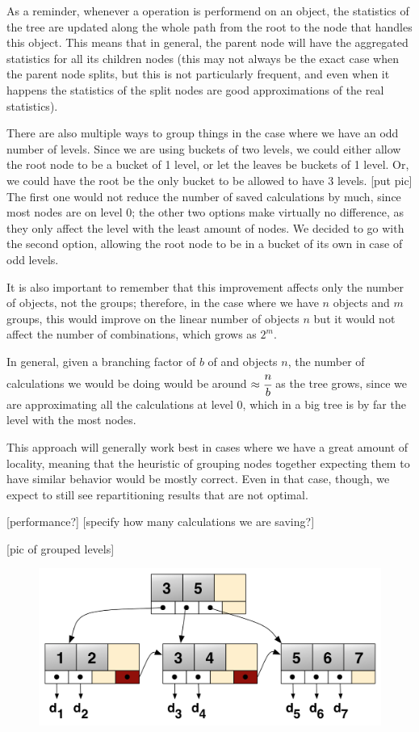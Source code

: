 As a reminder, whenever a operation is performend on an object, the statistics of the tree are updated along the whole path from the root to the node that handles this object. This means that in general, the parent node will have the aggregated statistics for all its children nodes (this may not always be the exact case when the parent node splits, but this is not particularly frequent, and even when it happens the statistics of the split nodes are good approximations of the real statistics).

There are also multiple ways to group things in the case where we have an odd number of levels. Since we are using buckets of two levels, we could either allow the root node to be a bucket of 1 level, or let the leaves be buckets of 1 level. Or, we could have the root be the only bucket to be allowed to have 3 levels. [put pic] The first one would not reduce the number of saved calculations by much, since most nodes are on level 0; the other two options make virtually no difference, as they only affect the level with the least amount of nodes. We decided to go with the second option, allowing the root node to be in a bucket of its own in case of odd levels.

It is also important to remember that this improvement affects only the number of objects, not the groups; therefore, in the case where we have $n$ objects and $m$ groups, this would improve on the linear number of objects $n$ but it would not affect the number of combinations, which grows as $2^m$.

In general, given a branching factor of $b$ of and objects $n$, the number of calculations we would be doing would be around $\approx\cfrac{n}{b}$ as the tree grows, since we are approximating all the calculations at level 0, which in a big tree is by far the level with the most nodes.

This approach will generally work best in cases where we have a great amount of locality, meaning that the heuristic of grouping nodes together expecting them to have similar behavior would be mostly correct. Even in that case, though, we expect to still see repartitioning results that are not optimal.

[performance?]
[specify how many calculations we are saving?]

[pic of grouped levels]
\begin{figure}[!htb]
  \centering
  \includegraphics[width=\textwidth,height=\textheight,keepaspectratio]{img/b+tree.png}
  \caption[caption]{ }
  \label{fig:fixed-size-buckets}
\end{figure}

